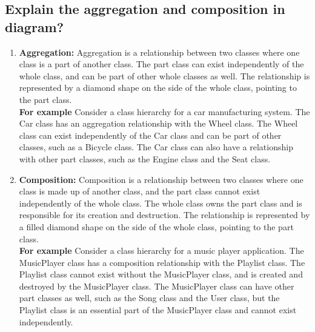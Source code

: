 \documentclass{article}
\begin{document}
\subsection{Explain the aggregation and composition in diagram?}
\begin{enumerate}
	\item \textbf{Aggregation:} Aggregation is a relationship between two classes where one class is a part of another class. The part class can exist independently of the whole class, and can be part of other whole classes as well. The relationship is represented by a diamond shape on the side of the whole class, pointing to the part class.\\
	\textbf{For example} Consider a class hierarchy for a car manufacturing system. The Car class has an aggregation relationship with the Wheel class. The Wheel class can exist independently of the Car class and can be part of other classes, such as a Bicycle class. The Car class can also have a relationship with other part classes, such as the Engine class and the Seat class.
	\item \textbf{Composition:} Composition is a relationship between two classes where one class is made up of another class, and the part class cannot exist independently of the whole class. The whole class owns the part class and is responsible for its creation and destruction. The relationship is represented by a filled diamond shape on the side of the whole class, pointing to the part class.\\
	\textbf{For example} Consider a class hierarchy for a music player application. The MusicPlayer class has a composition relationship with the Playlist class. The Playlist class cannot exist without the MusicPlayer class, and is created and destroyed by the MusicPlayer class. The MusicPlayer class can have other part classes as well, such as the Song class and the User class, but the Playlist class is an essential part of the MusicPlayer class and cannot exist independently.
\end{enumerate}
\end{document}
